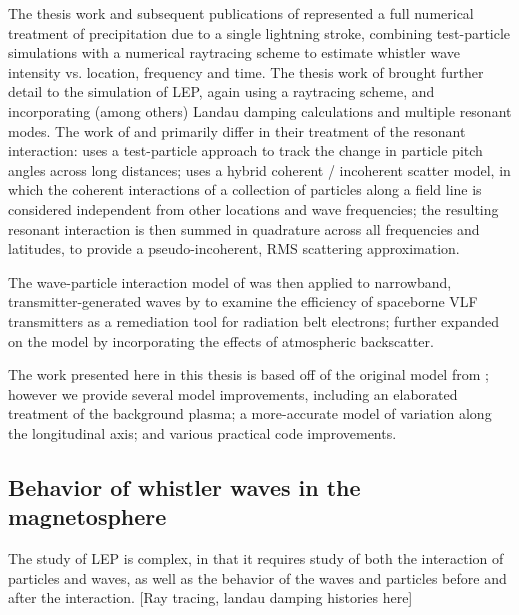 The thesis work and subsequent publications of \citeauthor{Lauben1998} \citep{Lauben1998, Lauben1999, Lauben2001} represented a full numerical treatment of precipitation due to a single lightning stroke, combining test-particle simulations with a numerical raytracing scheme to estimate whistler wave intensity vs. location, frequency and time. The thesis work of \cite{Bortnik2005} brought further detail to the simulation of LEP, again using a raytracing scheme, and incorporating (among others) Landau damping calculations and multiple resonant modes. The work of \citeauthor{Lauben1998} and \citeauthor{Bortnik2005} primarily differ in their treatment of the resonant interaction: \citeauthor{Lauben1998} uses a test-particle approach to track the change in particle pitch angles across long distances; \citeauthor{Bortnik2005} uses a hybrid coherent / incoherent scatter model, in which the coherent interactions of a collection of particles along a field line is considered independent from other locations and wave frequencies; the resulting resonant interaction is then summed in quadrature across all frequencies and latitudes, to provide a pseudo-incoherent, RMS scattering approximation.

The wave-particle interaction model of \cite{Bortnik2005, Bortnik2006} was then applied to narrowband, transmitter-generated waves by \cite{Kulkarni2009} to examine the efficiency of spaceborne VLF transmitters as a remediation tool for radiation belt electrons; \cite{Cotts2011} further expanded on the \citeauthor{Bortnik2005} model by incorporating the effects of atmospheric backscatter.

The work presented here in this thesis is based off of the original model from \cite{Bortnik2005}; however we provide several model improvements, including an elaborated treatment of the background plasma; a more-accurate model of variation along the longitudinal axis; and various practical code improvements.

\subsection{Behavior of whistler waves in the magnetosphere}
The study of LEP is complex, in that it requires study of both the interaction of particles and waves, as well as the behavior of the waves and particles before and after the interaction. [Ray tracing, landau damping histories here]

